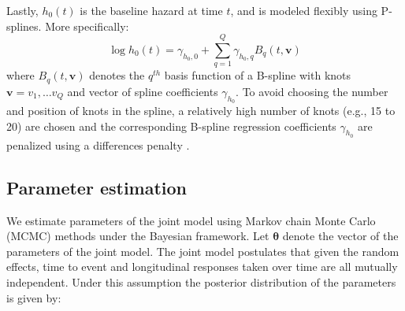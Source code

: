 Lastly, $h_0(t)$ is the baseline hazard at time $t$, and is modeled flexibly using P-splines. More specifically:
\begin{equation*}
\log{h_0(t)} = \gamma_{h_0,0} + \sum_{q=1}^Q \gamma_{h_0,q} B_q(t, \boldsymbol{v})
\end{equation*}
where $B_q(t, \boldsymbol{v})$ denotes the $q^{th}$ basis function of a B-spline with knots $\boldsymbol{v} = v_1, \ldots v_Q$ and vector of spline coefficients $\gamma_{h_0}$. To avoid choosing the number and position of knots in the spline, a relatively high number of knots (e.g., 15 to 20) are chosen and the corresponding B-spline regression coefficients $\gamma_{h_0}$ are penalized using a differences penalty \citep{eilers1996flexible}.

\subsection{Parameter estimation}
\label{subsec : jm_param_estimation_bayesian}
We estimate parameters of the joint model using Markov chain Monte Carlo (MCMC) methods under the Bayesian framework. Let $\boldsymbol{\theta}$ denote the vector of the parameters of the joint model. The joint model postulates that given the random effects, time to event and longitudinal responses taken over time are all mutually independent. Under this assumption the posterior distribution of the parameters is given by:

